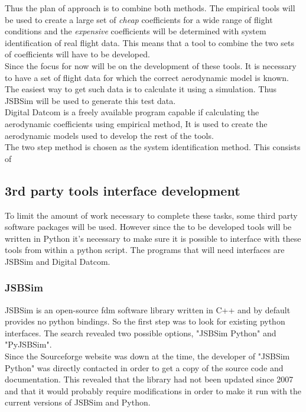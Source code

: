 Thus the plan of approach is to combine both methods. The empirical tools will be used to create a large set of \textit{cheap} coefficients for a wide range of flight conditions and the \textit{expensive} coefficients will be determined with system identification of real flight data. This means that a tool to combine the two sets of coefficients will have to be developed.\\

Since the focus for now will be on the development of these tools. It is necessary to have a set of flight data for which the correct aerodynamic model is known. The easiest way to get such data is to calculate it using a simulation. Thus JSBSim will be used to generate this test data.\\

Digital Datcom is a freely available program capable if calculating the aerodynamic coefficients using empirical method, It is used to create the aerodynamic models used to develop the rest of the tools.\\

The two step method is chosen as the system identification method. This consists of 

\subsection{3rd party tools interface development}
To limit the amount of work necessary to complete these tasks, some third party software packages will be used. However since the to be developed tools will be written in Python it's necessary to make sure it is possible to interface with these tools from within a python script. The programs that will need interfaces are JSBSim and Digital Datcom.

\subsubsection{JSBSim}
JSBSim is an open-source \gls{fdm} software library written in C++ and by default provides no python bindings. So the first step was to look for existing python interfaces. The search revealed two possible options, "JSBSim Python" and "PyJSBSim". \\

Since the Sourceforge website was down at the time, the developer of "JSBSim Python" was directly contacted in order to get a copy of the source code and documentation. This revealed that the library had not been updated since 2007 and that it would probably require modifications in order to make it run with the current versions of JSBSim and Python. \\

